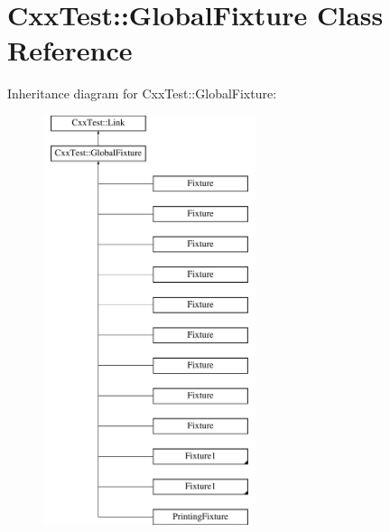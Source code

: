 \hypertarget{classCxxTest_1_1GlobalFixture}{\section{Cxx\-Test\-:\-:Global\-Fixture Class Reference}
\label{classCxxTest_1_1GlobalFixture}
}
Inheritance diagram for Cxx\-Test\-:\-:Global\-Fixture\-:\begin{figure}[H]
\begin{center}
\leavevmode
\includegraphics[height=12.000000cm]{classCxxTest_1_1GlobalFixture}
\end{center}
\end{figure}

